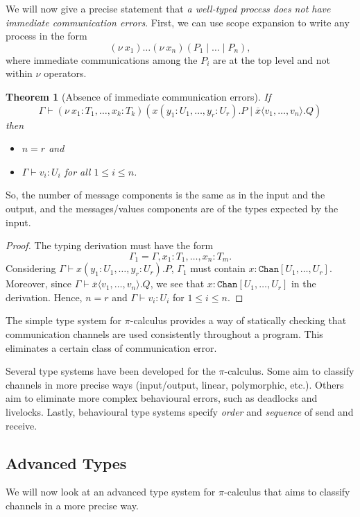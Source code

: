 \documentclass[a4paper, openany]{memoir}
\newtheorem{theorem}[proposition]{Theorem}
\theoremstyle{definition}
\begin{document}
    We will now give a precise statement that \emph{a well-typed process does not have immediate communication errors}. First, we can use scope expansion to write any process in the form
    \[(\nu \ x_1) \dots (\nu \ x_n)(P_1 \mid \dots \mid P_n),\]
    where immediate communications among the $P_i$ are at the top level and not within $\nu$ operators.
    \begin{theorem}[Absence of immediate communication errors]
        If 
        \[\Gamma \vdash (\nu \ x_1 \colon T_1, \dots, x_k \colon T_k)(x(y_1 \colon U_1, \dots, y_r \colon U_r).P \mid \overline{x} \langle v_1, \dots, v_n \rangle.Q)\]
        then
        \begin{itemize}
            \item $n = r$ and
            \item $\Gamma \vdash v_i \colon U_i$ for all $1 \leq i \leq n$.
        \end{itemize}
    \end{theorem}
    \noindent So, the number of message components is the same as in the input and the output, and the messages/values components are of the types expected by the input.
    \begin{proof}
        The typing derivation must have the form
        \[\Gamma_1 = \Gamma, x_1 \colon T_1, \dots, x_n \colon T_m.\]
        Considering $\Gamma \vdash x(y_1 \colon U_1, \dots, y_r \colon U_r).P$, $\Gamma_1$ must contain $x \colon \texttt{Chan}[U_1, \dots, U_r]$. Moreover, since $\Gamma \vdash \overline{x} \langle v_1, \dots, v_n \rangle.Q$, we see that $x \colon \texttt{Chan}[U_1, \dots, U_r]$ in the derivation. Hence, $n = r$ and $\Gamma \vdash v_i \colon U_i$ for $1 \leq i \leq n$.
    \end{proof}

    The simple type system for $\pi$-calculus provides a way of statically checking that communication channels are used consistently throughout a program. This eliminates a certain class of communication error.
    
    Several type systems have been developed for the $\pi$-calculus. Some aim to classify channels in more precise ways (input/output, linear, polymorphic, etc.). Others aim to eliminate more complex behavioural errors, such as deadlocks and livelocks. Lastly, behavioural type systems specify \emph{order} and \emph{sequence} of send and receive.
    
    \subsection{Advanced Types}
    We will now look at an advanced type system for $\pi$-calculus that aims to classify channels in a more precise way.
\end{document}
